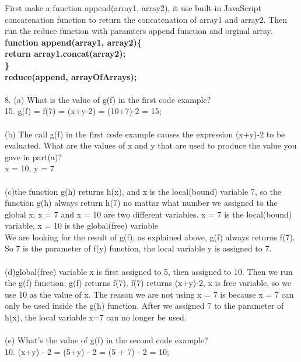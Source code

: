 \documentclass[12pt]{article}
\begin{document}
First make a function append(array1, array2), it use built-in JavaScript concatenation function to return the concatenation of array1 and array2. Then run the reduce function with paramters append function and orginal array.
\textbf{ function append(array1, array2)\{\\
\indent return array1.concat(array2);\\
\}\\
reduce(append, arrayOfArrays);}\\
\vspace{1mm}\\
8. (a) What is the value of g(f) in the first code example?\\
15.   \indent g(f) = f(7) = (x+y-2) = (10+7)-2 = 15;\\
\vspace{1mm}\\
(b) The call g(f) in the first code example causes the expression (x+y)-2 to be evaluated. What are the values of x and y that are used to produce the value you gave in part(a)?\\
x = 10, y = 7\\
\vspace{1mm}\\
(c)the function g(h) returns h(x), and x is the local(bound) variable 7, so the function g(h) always return h(7) no mattar what number we assigned to the global x; x = 7 and x = 10 are two different variables. x = 7 is the local(bound) variable, x = 10 is the global(free) variable\\
We are looking for the result of g(f), as explained above, g(f) always returns f(7). So 7 is the parameter of f(y) function, the local variable y is assigned to 7.\\
\vspace{1mm}\\
(d)global(free) variable x is first assigned to 5, then assigned to 10. Then we run the g(f) function. g(f) returns f(7), f(7) returns (x+y)-2, x is free variable, so we use 10 as the value of x. The reason we are not using x = 7 is because x = 7 can only be used inside the g(h) function. After we assigned 7 to the parameter of h(x), the local variable x=7 can no longer be used.\\
\vspace{1mm}\\
(e) What's the value of g(f) in the second code example?\\
10. \indent\indent(x+y) - 2 = (5+y) - 2 = (5 + 7) - 2 = 10;\\
\end{document}
